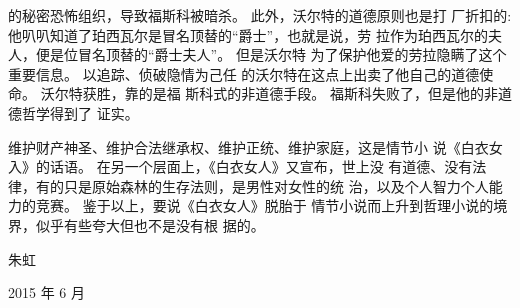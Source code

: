 \documentclass[a4paper]{article}
\begin{document}
的秘密恐怖组织，导致福斯科被暗杀。 此外，沃尔特的道德原则也是打
厂折扣的:他叭叭知道了珀西瓦尔是冒名顶替的“爵士”，也就是说，劳
拉作为珀西瓦尔的夫人，便是位冒名顶替的“爵士夫人”。 但是沃尔特
为了保护他爱的劳拉隐瞒了这个重要信息。 以追踪、侦破隐情为己任
的沃尔特在这点上出卖了他自己的道德使命。 沃尔特获胜，靠的是福
斯科式的非道德手段。 福斯科失败了，但是他的非道德哲学得到了
证实。

维护财产神圣、维护合法继承权、维护正统、维护家庭，这是情节小
说《白衣女入》的话语。 在另一个层面上，《白衣女人》又宣布，世上没
有道德、没有法律，有的只是原始森林的生存法则，是男性对女性的统
治，以及个人智力个人能力的竞赛。 鉴于以上，要说《白衣女人》脱胎于
情节小说而上升到哲理小说的境界，似乎有些夸大但也不是没有根
据的。

朱虹

2015 年 6 月
\end{document}
